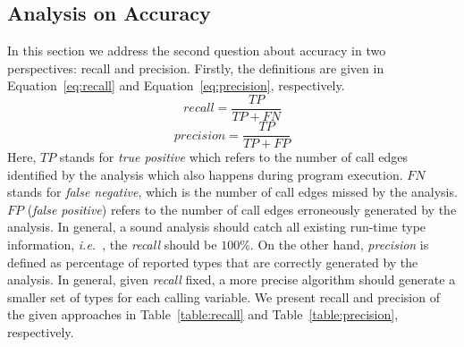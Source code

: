 \documentclass{fac}
\newcommand\ie{\textit{i.e.\ }}
\begin{document}
\subsection{Analysis on Accuracy}\label{subsec:accuracy}

In this section we address the second question about accuracy in two perspectives: recall and precision. Firstly, the definitions are given in Equation~\ref{eq:recall} and Equation~\ref{eq:precision}, respectively.
\begin{equation}\label{eq:recall}
recall = \dfrac{TP}{TP+FN}
\end{equation}
\begin{equation}\label{eq:precision}
precision =  \dfrac{TP}{TP+FP}
\end{equation}
Here, $TP$ stands for \emph{true positive} which refers to the number of call edges identified by the analysis which also happens during program execution. $FN$ stands for \emph{false negative}, which is the number of call edges missed by the analysis. $FP$ (\emph{false positive}) refers to the number of call edges erroneously generated by the analysis. In general, a sound analysis should catch all existing run-time type information, \ie, the \emph{recall} should be $100\%$. On the other hand, \emph{precision} is defined as percentage of reported types that are correctly generated by the analysis. In general, given \emph{recall} fixed, a more precise algorithm should generate a smaller set of types for each calling variable. %
We present recall and precision of the given approaches in Table~\ref{table:recall} and Table~\ref{table:precision}, respectively.


\end{document}
